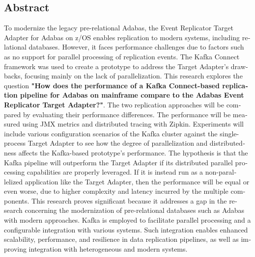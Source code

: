 

\begin{otherlanguage}{american}
	\chapter*{Abstract}
	To modernize the legacy pre-relational Adabas, the Event Replicator Target Adapter for Adabas on z/OS enables replication to modern systems, including relational databases. However, it faces performance challenges due to factors such as no support for parallel processing of replication events. The Kafka Connect framework was used to create a prototype to address the Target Adapter's drawbacks, focusing mainly on the lack of parallelization. This research explores the question \textbf{"How does the performance of a Kafka Connect-based replication pipeline for Adabas on mainframe compare to the Adabas Event Replicator Target Adapter?"}. The two replication approaches will be compared by evaluating their performance differences. The performance will be measured using JMX metrics and distributed tracing with Zipkin. Experiments will include various configuration scenarios of the Kafka cluster against the single-process Target Adapter to see how the degree of parallelization and distributedness affects the Kafka-based prototype's performance.
    The hypothesis is that the Kafka pipeline will outperform the Target Adapter if its distributed parallel processing capabilities are properly leveraged. If it is instead run as a non-parallelized application like the Target Adapter, then the performance will be equal or even worse, due to higher complexity and latency incurred by the multiple components. This research proves significant because it addresses a gap in the research concerning the modernization of pre-relational databases such as Adabas with modern approaches. Kafka is employed to facilitate parallel processing and a configurable integration with various systems. Such integration enables enhanced scalability, performance, and resilience in data replication pipelines, as well as improving integration with heterogeneous and modern systems.
\end{otherlanguage}
